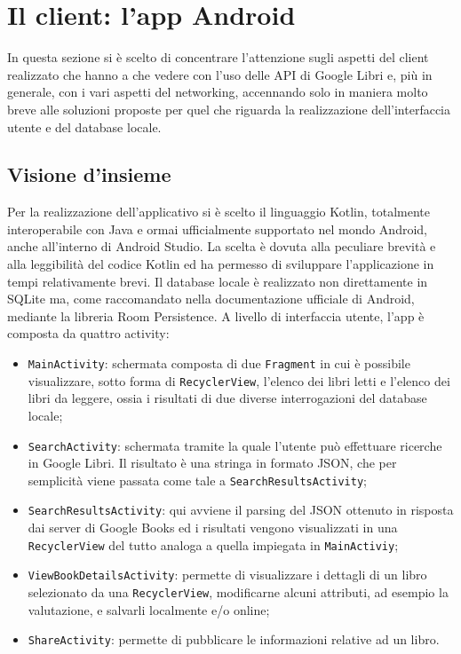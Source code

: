 \documentclass[a4paper]{article}
\def\code#1{\texttt{#1}}
\begin{document}
\section{Il client: l'app Android}
In questa sezione si è scelto di concentrare l'attenzione sugli aspetti del client realizzato che hanno a che vedere con l'uso delle API di Google Libri e, più in generale, con i vari aspetti del networking, accennando solo in maniera molto breve alle soluzioni proposte per quel che riguarda la realizzazione dell'interfaccia utente e del database locale.
	\subsection{Visione d'insieme}
	Per la realizzazione dell'applicativo si è scelto il linguaggio Kotlin, totalmente interoperabile con Java e ormai ufficialmente supportato nel mondo Android, anche all'interno di Android Studio. La scelta è dovuta alla peculiare brevità e alla leggibilità del codice Kotlin ed ha permesso di sviluppare l'applicazione in tempi relativamente brevi.\newline
	Il database locale è realizzato non direttamente in SQLite ma, come raccomandato nella documentazione ufficiale di Android, mediante la libreria Room Persistence.
	A livello di interfaccia utente, l'app è composta da quattro activity:
	\begin{itemize}
		\item \code{MainActivity}: schermata composta di due \code{Fragment} in cui è possibile visualizzare, sotto forma di \code{RecyclerView}, l'elenco dei libri letti e l'elenco dei libri da leggere, ossia i risultati di due diverse interrogazioni del database locale;
		\item \code{SearchActivity}: schermata tramite la quale l'utente può effettuare ricerche in Google Libri. Il risultato è una stringa in formato JSON, che per semplicità viene passata come tale a \code{SearchResultsActivity};
		\item \code{SearchResultsActivity}: qui avviene il parsing del JSON ottenuto in risposta dai server di Google Books ed i risultati vengono visualizzati in una \code{RecyclerView} del tutto analoga a quella impiegata in \code{MainActiviy};
		\item \code{ViewBookDetailsActivity}: permette di visualizzare i dettagli di un libro selezionato da una \code{RecyclerView}, modificarne alcuni attributi, ad esempio la valutazione, e salvarli localmente e/o online;
		\item \code{ShareActivity}: permette di pubblicare le informazioni relative ad un libro.
	\end{itemize}
\end{document}
